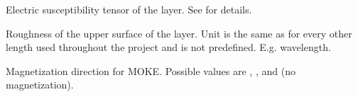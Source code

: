 \documentclass[letterpaper,10pt,english]{sphinxmanual}
\begin{document}
\begin{fulllineitems}
\begin{fulllineitems}
\label{\detokenize{modules-api/samplerepresentation:SampleRepresentation.LayerObject.chitensor}}
Electric susceptibility tensor of the layer. See {\hyperref[\detokenize{modules-api/samplerepresentation:SampleRepresentation.LayerObject.__init__}]{}} for details.

\end{fulllineitems}


\begin{fulllineitems}
\label{\detokenize{modules-api/samplerepresentation:SampleRepresentation.LayerObject.sigma}}
Roughness of the upper surface of the layer. Unit is the same as for every other length used throughout the project and is not predefined. E.g. wavelength.

\end{fulllineitems}


\begin{fulllineitems}
\label{\detokenize{modules-api/samplerepresentation:SampleRepresentation.LayerObject.magdir}}
Magnetization direction for MOKE. Possible values are , ,  and  (no magnetization).

\end{fulllineitems}


\end{fulllineitems}

\end{document}
